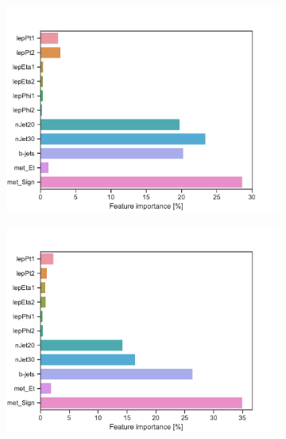 \begin{figure}[H]
\begin{subfigure}[t!]{0.49\textwidth}
        \includegraphics[width = \textwidth]{Figures/WW/BDT/Low_level/Inter/featureImportance.pdf}
        \caption{}
        \label{fig:traintestscaled}
    \end{subfigure}
    \begin{subfigure}[t!]{0.49\textwidth}
        \includegraphics[width = \textwidth]{Figures/Mono_Z/ML/BDT/Low_level/Inter/featureImportance.pdf}
        \caption{}
        \label{fig:ROCBDTLow_low_level}
    \end{subfigure}
    \caption{}
    \label{fig:resExample}
\end{figure}

